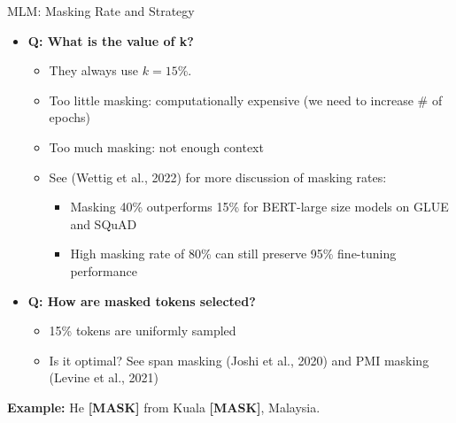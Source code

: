 \documentclass[serif, aspectratio=169]{beamer}
\begin{document}
\begin{frame}{MLM: Masking Rate and Strategy}
    \begin{itemize}
        \item \textbf{Q: What is the value of k?}
        \begin{itemize}
            \item They always use $k = 15\%$.
            \item Too little masking: computationally expensive (we need to increase \# of epochs)
            \item Too much masking: not enough context
            \item See \textcolor{green!50!black}{(Wettig et al., 2022)} for more discussion of masking rates:
            \begin{itemize}
                \item Masking 40\% outperforms 15\% for BERT-large size models on GLUE and SQuAD
                \item High masking rate of 80\% can still preserve 95\% fine-tuning performance
            \end{itemize}
        \end{itemize}
        
        \vspace{0.5cm}
        
        \item \textbf{Q: How are masked tokens selected?}
        \begin{itemize}
            \item 15\% tokens are uniformly sampled
            \item Is it optimal? See span masking \textcolor{green!50!black}{(Joshi et al., 2020)} and PMI masking \textcolor{green!50!black}{(Levine et al., 2021)}
        \end{itemize}
    \end{itemize}
    
    \vspace{0.5cm}
    
    \textbf{Example:} He \textbf{[MASK]} from Kuala \textbf{[MASK]}, Malaysia.
    
\end{frame}
\end{document}

